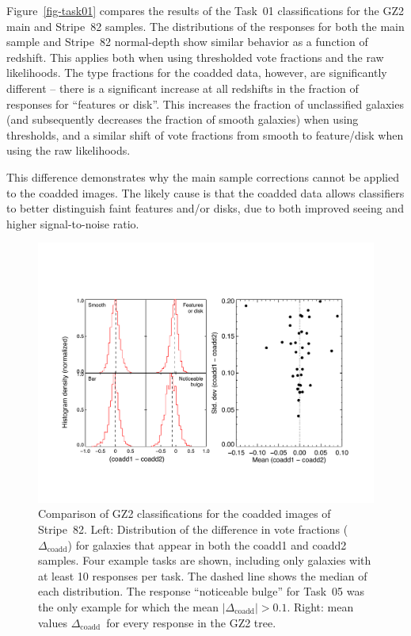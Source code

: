 \documentclass[useAMS,usenatbib]{mn2e}
\newcommand{\dcoadd}{$\Delta_\mathrm{coadd}$}
\begin{document}
Figure~\ref{fig-task01} compares the results of the Task~01 classifications for the GZ2 main and Stripe~82 samples. The distributions of the responses for both the main sample and Stripe~82 normal-depth show similar behavior as a function of redshift. This applies both when using thresholded vote fractions and the raw likelihoods. The type fractions for the coadded data, however, are significantly different -- there is a significant increase at all redshifts in the fraction of responses for ``features or disk''. This increases the fraction of unclassified galaxies (and subsequently decreases the fraction of smooth galaxies) when using thresholds, and a similar shift of vote fractions from smooth to feature/disk when using the raw likelihoods. 

This difference demonstrates why the main sample corrections cannot be applied to the coadded images. The likely cause is that the coadded data allows classifiers to better distinguish faint features and/or disks, due to both improved seeing \citep[from $1.4\arcsec$ to $1.1\arcsec$;][]{ann11} and higher signal-to-noise ratio.

\begin{figure}
\includegraphics[angle=0,width=7.0in]{figures/stripe82_coadd_compare.pdf}
\caption{Comparison of GZ2 classifications for the coadded images of Stripe~82. Left: Distribution of the difference in vote fractions (\dcoadd) for galaxies that appear in both the coadd1 and coadd2 samples. Four example tasks are shown, including only galaxies with at least 10 responses per task. The dashed line shows the median of each distribution. The response ``noticeable bulge'' for Task~05 was the only example for which the mean $|\Delta_\mathrm{coadd}| > 0.1$. Right: mean values \dcoadd~for every response in the GZ2 tree. 
\label{fig-stripe82_compare}}
\end{figure}
\end{document}
